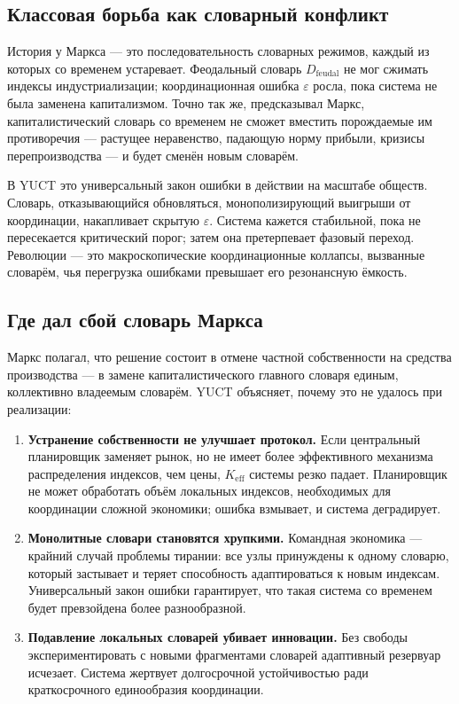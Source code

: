 \documentclass[12pt,a4paper]{article}
\begin{document}
	\subsection{Классовая борьба как словарный конфликт}
	
	История у Маркса — это последовательность словарных режимов, каждый из которых со временем устаревает. Феодальный словарь \(D_{\text{feudal}}\) не мог сжимать индексы индустриализации; координационная ошибка \(\varepsilon\) росла, пока система не была заменена капитализмом. Точно так же, предсказывал Маркс, капиталистический словарь со временем не сможет вместить порождаемые им противоречия — растущее неравенство, падающую норму прибыли, кризисы перепроизводства — и будет сменён новым словарём.
	
	В YUCT это универсальный закон ошибки в действии на масштабе обществ. Словарь, отказывающийся обновляться, монополизирующий выигрыши от координации, накапливает скрытую \(\varepsilon\). Система кажется стабильной, пока не пересекается критический порог; затем она претерпевает фазовый переход. Революции — это макроскопические координационные коллапсы, вызванные словарём, чья перегрузка ошибками превышает его резонансную ёмкость.
	
	\subsection{Где дал сбой словарь Маркса}
	
	Маркс полагал, что решение состоит в отмене частной собственности на средства производства — в замене капиталистического главного словаря единым, коллективно владеемым словарём. YUCT объясняет, почему это не удалось при реализации:
	
	\begin{enumerate}[leftmargin=*]
		\item \textbf{Устранение собственности не улучшает протокол.} Если центральный планировщик заменяет рынок, но не имеет более эффективного механизма распределения индексов, чем цены, \(K_{\mathrm{eff}}\) системы резко падает. Планировщик не может обработать объём локальных индексов, необходимых для координации сложной экономики; ошибка взмывает, и система деградирует.
		\item \textbf{Монолитные словари становятся хрупкими.} Командная экономика — крайний случай проблемы тирании: все узлы принуждены к одному словарю, который застывает и теряет способность адаптироваться к новым индексам. Универсальный закон ошибки гарантирует, что такая система со временем будет превзойдена более разнообразной.
		\item \textbf{Подавление локальных словарей убивает инновации.} Без свободы экспериментировать с новыми фрагментами словарей адаптивный резервуар исчезает. Система жертвует долгосрочной устойчивостью ради краткосрочного единообразия координации.
	\end{enumerate}
	
\end{document}
